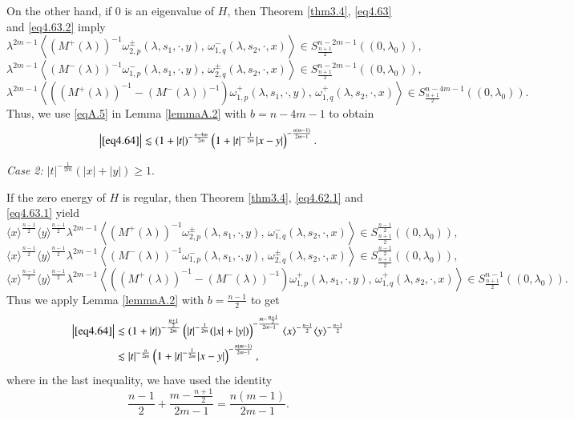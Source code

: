 \documentclass[11pt,reqno]{amsart}
\numberwithin{equation}{section}
\theoremstyle{definition}
\begin{document}
On the other hand, if $0$ is an eigenvalue of $H$, then Theorem \ref{thm3.4}, \eqref{eq4.63} and \eqref{eq4.63.2} imply
$$\lambda^{2m-1}\left\langle  (M^+(\lambda))^{-1}\omega_{2,p}^{\pm}(\lambda,s_{1},\cdot,y),\,\omega_{1,q}^{-}(\lambda,s_{2},\cdot,x)\right\rangle\in S_{\frac{n+1}{2}}^{n-2m-1}((0,\lambda_{0})),$$
$$\lambda^{2m-1}\left\langle  (M^-(\lambda))^{-1}\omega_{1,p}^{-}(\lambda,s_{1},\cdot,y),\,\omega_{2,q}^{\pm}(\lambda,s_{2},\cdot,x)\right\rangle\in S_{\frac{n+1}{2}}^{n-2m-1}((0,\lambda_{0})),$$
$$\lambda^{2m-1}\left\langle ((M^+(\lambda))^{-1}-(M^-(\lambda))^{-1})\omega_{1,p}^{+}(\lambda,s_{1},\cdot,y),\,\omega_{1,q}^{+}(\lambda,s_{2},\cdot,x)\right\rangle \in S_{\frac{n+1}{2}}^{n-4m-1}((0,\lambda_{0})).$$
Thus, we use \eqref{eqA.5} in Lemma \ref{lemmaA.2} with $b=n-4m-1$ to obtain
\begin{equation}\label{eq4.67000}
\left| \eqref{eq4.64}\right| \lesssim (1+|t|)^{-\frac{n-4m}{2m}}\left(1+|t|^{-\frac{1}{2m}}|x-y|\right)^{-\frac{n(m-1)}{2m-1}}.
\end{equation}


\noindent\emph{Case 2:}  $|t|^{-\frac{1}{2m}}(|x|+|y|)\geq1$.\


If the zero energy of $H$ is regular, then Theorem \ref{thm3.4}, \eqref{eq4.62.1} and \eqref{eq4.63.1}  yield
{\small
$$\langle x\rangle^{\frac{n-1}{2}} \langle y\rangle^{\frac{n-1}{2}}\lambda^{2m-1}\left\langle  (M^+(\lambda))^{-1}\omega_{2,p}^{\pm}(\lambda,s_{1},\cdot,y),\,\omega_{1,q}^{-}(\lambda,s_{2},\cdot,x)\right\rangle\in S_{\frac{n+1}{2}}^{\frac{n-1}{2}}((0,\lambda_{0})),$$
$$\langle x\rangle^{\frac{n-1}{2}} \langle y\rangle^{\frac{n-1}{2}}\lambda^{2m-1}\left\langle  (M^-(\lambda))^{-1}\omega_{1,p}^{-}(\lambda,s_{1},\cdot,y),\,\omega_{2,q}^{\pm}(\lambda,s_{2},\cdot,x)\right\rangle\in S_{\frac{n+1}{2}}^{\frac{n-1}{2}}((0,\lambda_{0})),$$
$$\langle x\rangle^{\frac{n-1}{2}} \langle y\rangle^{\frac{n-1}{2}}\lambda^{2m-1}\left\langle ((M^+(\lambda))^{-1}-(M^-(\lambda))^{-1})\omega_{1,p}^{+}(\lambda,s_{1},\cdot,y),\,\omega_{1,q}^{+}(\lambda,s_{2},\cdot,x)\right\rangle \in S_{\frac{n+1}{2}}^{n-1}((0,\lambda_{0})).$$
}
Thus we apply Lemma \ref{lemmaA.2} with $b=\frac{n-1}{2}$ to get
\begin{equation} \label{eq4.68}
	\begin{aligned}
		\left| \eqref{eq4.64}\right|
		&\lesssim(1+|t|)^{-\frac{\frac{n+1}{2}}{2m}} \left( |t|^{-\frac{1}{2m}}(|x|+|y|)\right) ^{-\frac{m-\frac{n+1}{2}}{2m-1}}\langle x\rangle^{-\frac{n-1}{2}} \langle y\rangle^{-\frac{n-1}{2}}\\
		&\lesssim |t|^{-\frac{n}{2m}}\left(1+|t|^{-\frac{1}{2m}}|x-y|\right)^{-\frac{n(m-1)}{2m-1}},
	\end{aligned}
\end{equation}
where in the last inequality, we have used the identity
$$
\mbox{$\frac{n-1}{2}+\frac{m-\frac{n+1}{2}}{2m-1}=\frac{n(m-1)}{2m-1}$}.
$$
\end{document}
